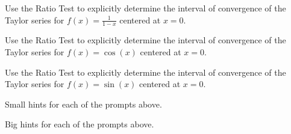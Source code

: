 \begin{activity} \label{8.5.Act4}
\ba
\item Use the Ratio Test to explicitly determine the interval of convergence of the Taylor series for $f(x) = \frac{1}{1-x}$ centered at $x=0$.
\item Use the Ratio Test to explicitly determine the interval of convergence of the Taylor series for $f(x) = \cos(x)$ centered at $x=0$.
\item Use the Ratio Test to explicitly determine the interval of convergence of the Taylor series for $f(x) = \sin(x)$ centered at $x=0$.
\ea


\end{activity}

\begin{smallhint}
\ba
	\item Small hints for each of the prompts above.
\ea
\end{smallhint}
\begin{bighint}
\ba
	\item Big hints for each of the prompts above.
\ea
\end{bighint}
